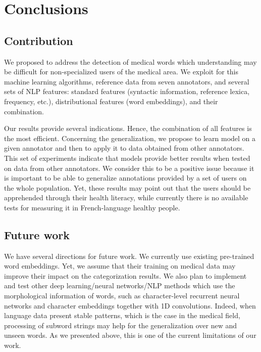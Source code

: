 \chapter{Conclusions}
\label{ch:conclusions}

\section{Contribution}

We proposed to address the detection of medical words which understanding may be difficult for non-specialized users of the medical area. We exploit for this machine learning algorithms,
reference data from seven annotators, and several sets of NLP features: standard features (syntactic information, reference lexica, frequency, etc.), distributional features (word embeddings), and their
combination.

Our results provide several indications.
Hence, the combination of all features is the most efficient.
Concerning the generalization, we propose to learn model on a given
annotator and then to apply it to data obtained from other annotators.
This set of experiments indicate that models provide better results
when tested on data from other annotators.
We consider this to be a positive issue because it is important to be
able to generalize annotations provided by a set of users on the whole
population.
Yet, these results may point out that the users should be apprehended
through their health literacy, while currently there is no available
tests for measuring it in French-language healthy people.

\section{Future work}
We have several directions for future work. We currently use existing pre-trained word embeddings. Yet, we assume that their training on medical data may improve their impact on the categorization results. We also plan to implement and test other deep learning/neural networks/NLP methods which use the morphological information of words, such as character-level recurrent neural networks and character embeddings together with 1D convolutions. Indeed, when language data present stable patterns, which is the case in the medical field, processing of subword strings may help for the generalization over new and unseen words. As we presented above, this is one of the current limitations of our work. 